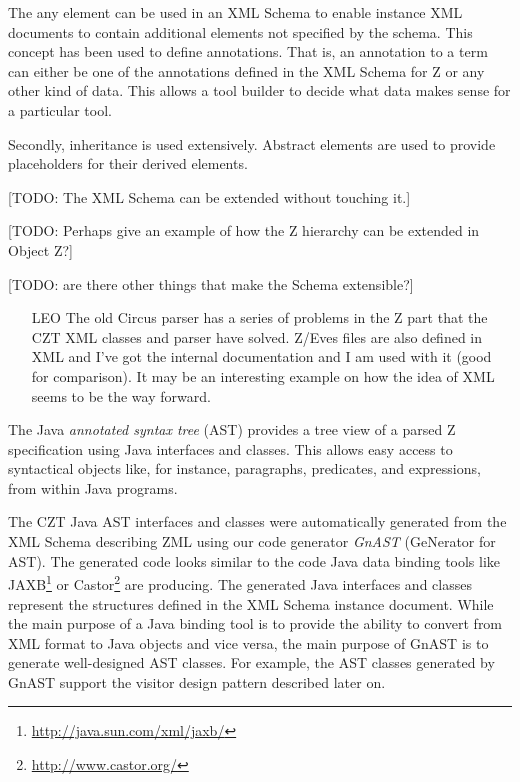 \documentclass{llncs}
\begin{document}
  The any element can be used in an XML Schema to enable instance XML
  documents to contain additional elements not specified by the
  schema.  This concept has been used to define annotations.  That is,
  an annotation to a term can either be one of the annotations defined
  in the XML Schema for Z or any other kind of data.  This allows a
  tool builder to decide what data makes sense for a particular tool.

  Secondly, inheritance is used extensively.  Abstract elements are
  used to provide placeholders for their derived elements.

  [TODO: The XML Schema can be extended without touching it.]

  [TODO: Perhaps give an example of how the Z hierarchy can be
  extended in Object Z?]

  [TODO: are there other things that make the Schema extensible?]

  \begin{itemize}
    \item[LEO] The old Circus parser has a series of problems in the Z
      part that the CZT XML classes and parser have solved.  Z/Eves
      files are also defined in XML and I've got the internal
      documentation and I am used with it (good for comparison).  It
      may be an interesting example on how the idea of XML seems to be
      the way forward.
  \end{itemize}



  The Java \emph{annotated syntax tree} (AST) provides a tree view of
  a parsed Z specification using Java interfaces and classes.  This
  allows easy access to syntactical objects like, for instance,
  paragraphs, predicates, and expressions, from within Java programs.

  The CZT Java AST interfaces and classes were automatically generated
  from the XML Schema describing ZML using our code generator
  \emph{GnAST} (GeNerator for AST).  The generated code looks similar
  to the code Java data binding tools like
  JAXB\footnote{\url{http://java.sun.com/xml/jaxb/}} or
  Castor\footnote{\url{http://www.castor.org/}} are producing.  The
  generated Java interfaces and classes represent the structures
  defined in the XML Schema instance document.  While the main purpose
  of a Java binding tool is to provide the ability to convert from XML
  format to Java objects and vice versa, the main purpose of GnAST is
  to generate well-designed AST classes.  For example, the AST classes
  generated by GnAST support the visitor design pattern described
  later on.
\end{document}
